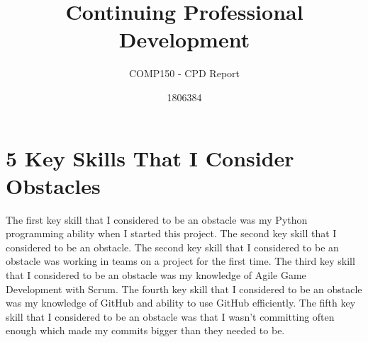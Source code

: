 \documentclass{scrartcl}
\title{Continuing Professional Development}
\subtitle{COMP150 - CPD Report}
\author{1806384}
\begin{document}
\maketitle

\section{5 Key Skills That I Consider Obstacles}
The first key skill that I considered to be an obstacle was my Python programming ability when I started this project.  The second key skill that I considered to  be  an  obstacle.   The  second  key  skill  that  I  considered  to  be  an  obstacle was working in teams on a project for the first time.  The third key skill that I considered to be an obstacle was my knowledge of Agile Game Development with Scrum.  The fourth key skill that I considered to be an obstacle was my knowledge of GitHub and ability to use GitHub efficiently.  The fifth key skill that I considered to be an obstacle was that I wasn't committing often enough which made my commits bigger than they needed to be.
\end{document}
